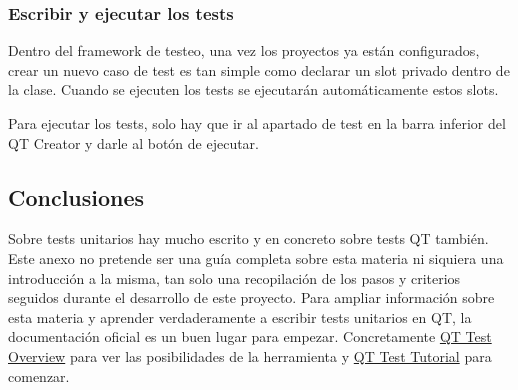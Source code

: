 \subsubsection{Escribir y ejecutar los tests}

Dentro del framework de testeo, una vez los proyectos ya están configurados, crear un nuevo caso de test es tan simple como declarar un slot privado dentro de la clase. Cuando se ejecuten los tests se ejecutarán automáticamente estos slots.

Para ejecutar los tests, solo hay que ir al apartado de test en la barra inferior del QT Creator y darle al botón de ejecutar.

\subsection{Conclusiones}

Sobre tests unitarios hay mucho escrito y en concreto sobre tests QT también. Este anexo no pretende ser una guía completa sobre esta materia ni siquiera una introducción a la misma, tan solo una recopilación de los pasos y criterios seguidos durante el desarrollo de este proyecto. Para ampliar información sobre esta materia y aprender verdaderamente a escribir tests unitarios en QT, la documentación oficial es un buen lugar para empezar. Concretamente \href{https://doc.qt.io/qt-5/qtest-overview.html}{QT Test Overview} \cite{QTTestOverview} para ver las posibilidades de la herramienta y \href{https://doc.qt.io/qt-5/qtest-tutorial.html}{QT Test Tutorial} \cite{QTTesTutorial} para comenzar.

\chapterend
